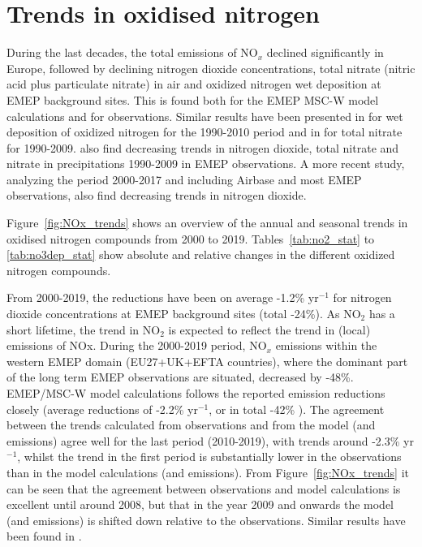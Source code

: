 \section{\label{sec:Trends_oxidised_nitrogen }Trends in oxidised nitrogen}

During the last decades, the total emissions of NO$_x$ declined significantly in Europe, followed by declining nitrogen dioxide concentrations, total nitrate (nitric acid plus particulate nitrate) in air and oxidized nitrogen wet deposition at EMEP background sites. This is found both for the EMEP MSC-W model calculations and for observations. Similar results have been presented in \citet{Theobald2019} for wet deposition of oxidized nitrogen for the 1990-2010 period and in \citet{Banzhaf2015} for total nitrate for 1990-2009. \citet{torseth2012} also find decreasing trends in nitrogen dioxide, total nitrate and nitrate in precipitations 1990-2009 in EMEP observations. A more recent study, analyzing the period 2000-2017 \citep{Colette2021} and including Airbase and most EMEP observations, also find decreasing trends in nitrogen dioxide.

Figure~\ref{fig:NOx_trends} shows an overview of the annual and seasonal trends in oxidised nitrogen compounds from 2000 to 2019. Tables~\ref{tab:no2_stat} to \ref{tab:no3dep_stat} show absolute and relative changes in the different oxidized nitrogen compounds.

From 2000-2019, the reductions have been on average -1.2\% yr$^{-1}$ for nitrogen dioxide concentrations at EMEP background sites (total -24\%). As NO$_2$ has a short lifetime, the trend in NO$_2$ is expected to reflect the trend in (local) emissions of NOx. During the 2000-2019 period, NO$_x$ emissions within the western EMEP domain (EU27+UK+EFTA countries), where the dominant part of the long term EMEP observations are situated, decreased by -48\%. EMEP/MSC-W model calculations follows the reported emission reductions closely (average reductions of -2.2\% yr$^{-1}$, or in total -42\% ). 
The agreement between the trends calculated from observations and from the model (and emissions) agree well for the last period (2010-2019), with trends around -2.3\% yr$^{-1}$, whilst the trend in the first period is substantially lower in the observations than in the model calculations (and emissions). From Figure~\ref{fig:NOx_trends} it can be seen that the agreement between observations and model calculations is excellent until around 2008, but that in the year 2009 and onwards the model (and emissions) is shifted down relative to the observations. Similar results have been found in \citep{Colette2021}.




